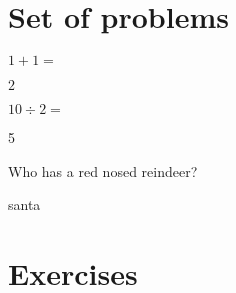 \documentclass{article}
\begin{document}
	
	\section*{Set of problems}
	
	\begin{exercise}[ID=A]
		$1+1=$
	\end{exercise}
	\begin{solution}
		$2$
	\end{solution}
	\begin{exercise}[ID=B]
		$10\div2=$
	\end{exercise}
	\begin{solution}
		5
	\end{solution}
	\begin{exercise}[ID=C]
		Who has a red nosed reindeer?
	\end{exercise}
	\begin{solution}
		santa
	\end{solution}
	
	
	\section*{Exercises}
	
	\newpage
	
	\printsolutions
	
\end{document}
